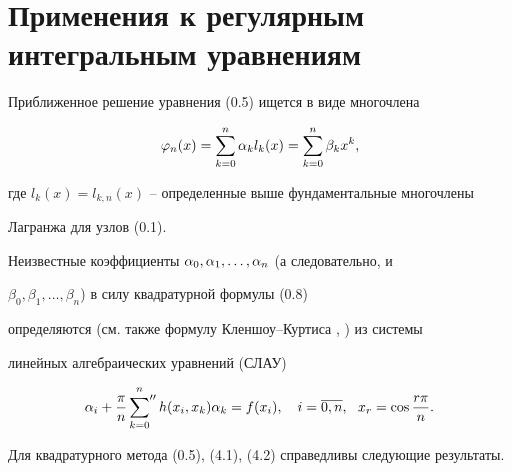 \section{Применения к регулярным интегральным уравнениям}





Приближенное решение уравнения (0.5) ищется в виде многочлена


\begin{equation}


\vp_n(x)=\sum_{k=0}^n\al_k l_k(x)=\sum_{k=0}^n\beta_k x^k,


\end{equation}


где $l_k(x)=l_{k,n}(x)$ -- определенные выше фундаментальные многочлены


Лагранжа для узлов (0.1).


Неизвестные коэффициенты $\alpha_0,\alpha_1,\dotsc,\alpha_n$ (а следовательно, и


$\beta_0,\beta_1,\dotsc,\beta_n$) в силу квадратурной формулы (0.8) 


определяются (см. также формулу Кленшоу--Куртиса \cite{1}, \cite{17}) из системы 


линейных алгебраических уравнений (СЛАУ)


\begin{equation}


\al_i+\frac{\pi}{n}\sideset{}{''}\sum_{k=0}^n h(x_i,x_k)\al_k=f(x_i),


\quad i=\ol{0,n},\ \ x_r=\cos\frac{r\pi}{n}.


\end{equation}





Для квадратурного метода (0.5), (4.1), (4.2) справедливы следующие результаты.








